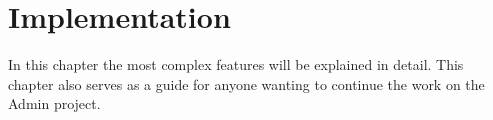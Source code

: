 \chapter{Implementation}
In this chapter the most complex features will be explained in detail. This chapter also serves as a guide for anyone wanting to continue the work on the Admin project.